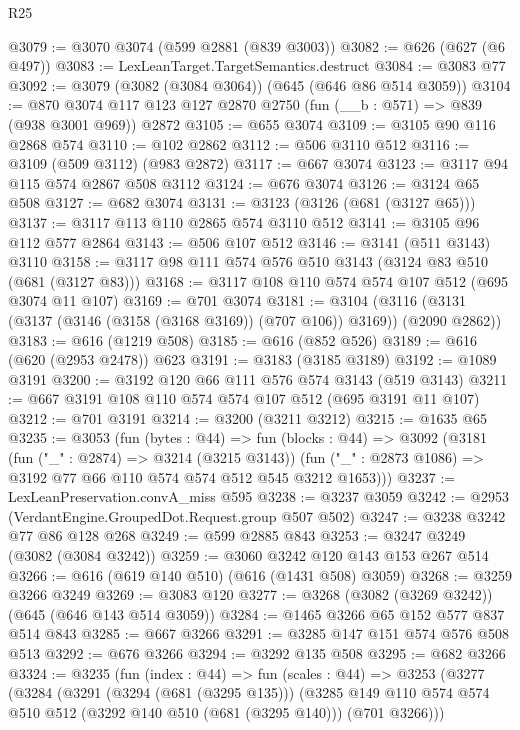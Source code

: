 \begin{lexlean}{R25}
\begin{coremodule}
@3079 := @3070 @3074 (@599 @2881 (@839 @3003))
@3082 := @626 (@627 (@6 @497))
@3083 := LexLeanTarget.TargetSemantics.destruct
@3084 := @3083 @77
@3092 := @3079 (@3082 (@3084 @3064)) (@645 (@646 @86 @514 @3059))
@3104 := @870 @3074 @117 @123 @127 @2870 @2750 (fun (__b : @571) => @839 (@938 @3001 @969)) @2872
@3105 := @655 @3074
@3109 := @3105 @90 @116 @2868 @574
@3110 := @102 @2862
@3112 := @506 @3110 @512
@3116 := @3109 (@509 @3112) (@983 @2872)
@3117 := @667 @3074
@3123 := @3117 @94 @115 @574 @2867 @508 @3112
@3124 := @676 @3074
@3126 := @3124 @65 @508
@3127 := @682 @3074
@3131 := @3123 (@3126 (@681 (@3127 @65)))
@3137 := @3117 @113 @110 @2865 @574 @3110 @512
@3141 := @3105 @96 @112 @577 @2864
@3143 := @506 @107 @512
@3146 := @3141 (@511 @3143) @3110
@3158 := @3117 @98 @111 @574 @576 @510 @3143 (@3124 @83 @510 (@681 (@3127 @83)))
@3168 := @3117 @108 @110 @574 @574 @107 @512 (@695 @3074 @11 @107)
@3169 := @701 @3074
@3181 := @3104 (@3116 (@3131 (@3137 (@3146 (@3158 (@3168 @3169)) (@707 @106)) @3169)) (@2090 @2862))
@3183 := @616 (@1219 @508)
@3185 := @616 (@852 @526)
@3189 := @616 (@620 (@2953 @2478)) @623
@3191 := @3183 (@3185 @3189)
@3192 := @1089 @3191
@3200 := @3192 @120 @66 @111 @576 @574 @3143 (@519 @3143)
@3211 := @667 @3191 @108 @110 @574 @574 @107 @512 (@695 @3191 @11 @107)
@3212 := @701 @3191
@3214 := @3200 (@3211 @3212)
@3215 := @1635 @65
@3235 := @3053
    (fun (bytes : @44) =>
    fun (blocks : @44) =>
    @3092
      (@3181
        (fun ("_" : @2874) => @3214 (@3215 @3143))
        (fun ("_" : @2873 @1086) => @3192 @77 @66 @110 @574 @574 @512 @545 @3212 @1653)))
@3237 := LexLeanPreservation.convA_miss @595
@3238 := @3237 @3059
@3242 := @2953 (VerdantEngine.GroupedDot.Request.group @507 @502)
@3247 := @3238 @3242 @77 @86 @128 @268
@3249 := @599 @2885 @843
@3253 := @3247 @3249 (@3082 (@3084 @3242))
@3259 := @3060 @3242 @120 @143 @153 @267 @514
@3266 := @616 (@619 @140 @510) (@616 (@1431 @508) @3059)
@3268 := @3259 @3266 @3249
@3269 := @3083 @120
@3277 := @3268 (@3082 (@3269 @3242)) (@645 (@646 @143 @514 @3059))
@3284 := @1465 @3266 @65 @152 @577 @837 @514 @843
@3285 := @667 @3266
@3291 := @3285 @147 @151 @574 @576 @508 @513
@3292 := @676 @3266
@3294 := @3292 @135 @508
@3295 := @682 @3266
@3324 := @3235
    (fun (index : @44) =>
    fun (scales : @44) =>
    @3253
      (@3277
        (@3284
          (@3291
            (@3294 (@681 (@3295 @135)))
            (@3285
              @149
              @110
              @574
              @574
              @510
              @512
              (@3292 @140 @510 (@681 (@3295 @140)))
              (@701 @3266)))

\end{coremodule}
\end{lexlean}
